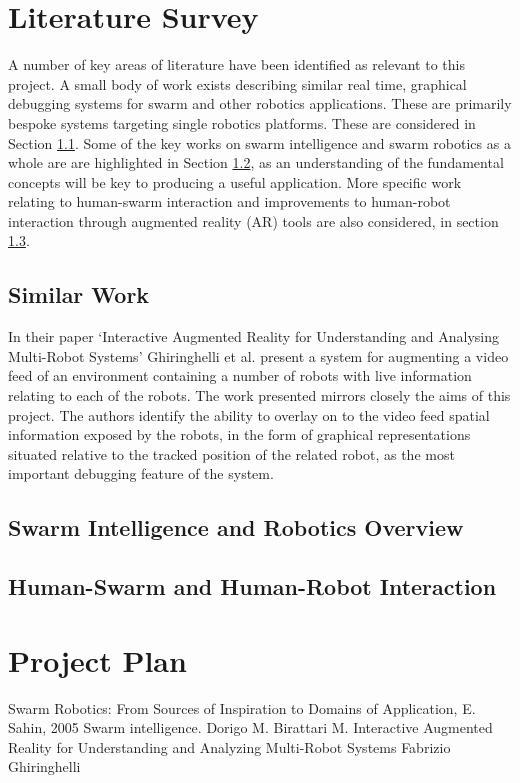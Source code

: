 \documentclass[titlepage,hidelinks,10pt]{article}
\begin{document}
\begin{multicols*}{2}
\section{Literature Survey}
A number of key areas of literature have been identified as relevant to this project. A small body of work exists describing similar real time, graphical debugging systems for swarm and other robotics applications. These are primarily bespoke systems targeting single robotics platforms. These are considered in Section \ref{SimilarWork}. Some of the key works on swarm intelligence and swarm robotics as a whole are are highlighted in Section \ref{GeneralSR}, as an understanding of the fundamental concepts will be key to producing a useful application.  More specific work relating to human-swarm interaction and improvements to human-robot interaction through augmented reality (AR) tools are also considered, in section \ref{HumanSwarmInteraction}.

\subsection{Similar Work} \label{SimilarWork}
In their paper `Interactive Augmented Reality for Understanding and Analysing Multi-Robot Systems' Ghiringhelli et al. present a system for augmenting a video feed of an environment containing a number of robots with live information relating to each of the robots\cite{LEDSwarmAR}. The work presented mirrors closely the aims of this project. The authors identify the ability to overlay on to the video feed spatial information exposed by the robots, in the form of graphical representations situated relative to the tracked position of the related robot, as the most important debugging feature of the system.

\subsection{Swarm Intelligence and Robotics Overview} \label{GeneralSR}

\subsection{Human-Swarm and Human-Robot Interaction} \label{HumanSwarmInteraction}


\section{Project Plan}
\begin{thebibliography}{1}
 Swarm Robotics: From Sources of
Inspiration to Domains of Application, E. Sahin, 2005
 Swarm intelligence. Dorigo M. Birattari M.
 Interactive Augmented Reality for Understanding and Analyzing Multi-Robot Systems Fabrizio Ghiringhelli
\end{thebibliography}

\end{multicols*}
\end{document}
